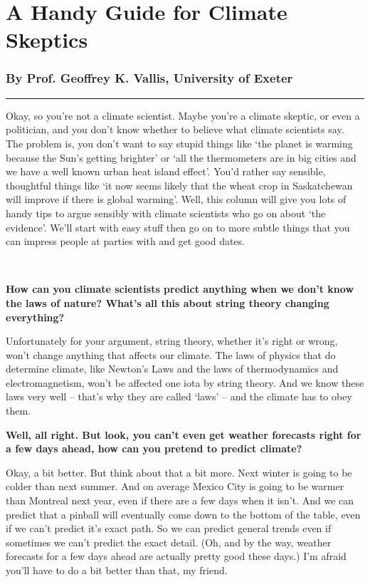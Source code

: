 \documentclass[11pt]{article}
\begin{document}



\section{\color{navy} A Handy Guide for Climate Skeptics}

\subsubsection{\color{navy} By Prof. Geoffrey K. Vallis, University of Exeter}

\begin{center}\rule{0.5\linewidth}{\linethickness}\end{center}

Okay, so you're not a climate scientist. Maybe you're a
climate skeptic, or even a politician, and you
don't know whether to believe what climate scientists say. The
problem is, you don't want to say stupid things like `the planet is
warming because the Sun's getting brighter' or `all the thermometers are
in big cities and we have a well known urban heat island effect'. You'd
rather say sensible, thoughtful things like `it now seems
likely that the wheat crop in Saskatchewan will improve if there is
global warming'. Well, this column will give you lots of handy tips to
argue sensibly with climate scientists who go on about `the
evidence'.  We'll start with easy stuff then go on to
more subtle things that you can impress people at parties with and get
good dates.

~

\textbf{\color{navy} How can you climate scientists predict anything when we don't
know the laws of nature? What's all this about string theory changing
everything?}

Unfortunately for your argument, string theory, whether it's right or
wrong, won't change anything that affects our climate. The laws of
physics that do determine climate, like Newton's Laws and the laws of
thermodynamics and electromagnetism, won't be affected one iota by string theory. And we
know these laws very well -- that's why they are called `laws' -- and
the climate has to obey them.

\textbf{\color{navy} Well, all right. But look, you can't even get weather forecasts
right for a few days ahead, how can you pretend to predict climate?}

Okay, a bit better. But think about that a bit more. Next winter is
going to be colder than next summer. And on average Mexico City is going
to be warmer than Montreal next year, even if there are a few days when
it isn't. And we can predict that a pinball will eventually come down to
the bottom of the table, even if we can't predict it's exact path. So we
can predict general trends even if sometimes we can't predict the exact
detail. (Oh, and by the way, weather forecasts for a few days ahead are actually pretty good these days.)
I'm afraid you'll have to do a bit better than that, my friend.
\end{document}
